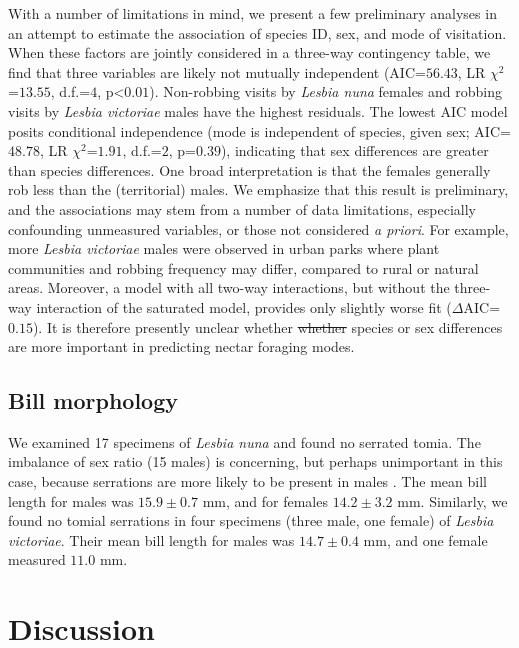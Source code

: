 \documentclass[fleqn,10pt,lineno]{wlpeerj}
\providecommand{\DIFdeltex}[1]{{\protect\color{red}\sout{#1}}}                      %
\providecommand{\DIFdelbegin}{} %
\providecommand{\DIFdelend}{} %
\providecommand{\DIFdel}[1]{\texorpdfstring{\DIFdeltex{#1}}{}} %
\begin{document}
With a number of limitations in mind, we present a few preliminary analyses in an attempt to estimate the association of species ID, sex, and mode of visitation. 
When these factors are jointly considered in a three-way contingency table, we find that three variables are likely not mutually independent (AIC=$56.43$, LR $\chi^{2}$=$13.55$, d.f.=$4$, p<$0.01$).
Non-robbing visits by \textit{Lesbia nuna} females and robbing visits by \textit{Lesbia victoriae} males have the highest residuals.
The lowest AIC model posits conditional independence (mode is independent of species, given sex; AIC=$48.78$, LR $\chi^{2}$=$1.91$, d.f.=$2$, p=$0.39$), indicating that sex differences are greater than species differences.
One broad interpretation is that the females generally rob less than the (territorial) males.
We emphasize that this result is preliminary, and the associations may stem from a number of data limitations, especially confounding unmeasured variables, or those not considered \textit{a priori}. 
For example, more \textit{Lesbia victoriae} males were observed in urban parks where plant communities and robbing frequency may differ, compared to rural or natural areas.
Moreover, a model with all two-way interactions, but without the three-way interaction of the saturated model, provides only slightly worse fit ($\Delta$AIC=$0.15$). It is therefore presently unclear whether \DIFdelbegin \DIFdel{whether }\DIFdelend species or sex differences are more important in predicting nectar foraging modes. %

\subsection*{Bill morphology}
We examined 17 specimens of \textit{Lesbia nuna} and found no serrated tomia. %
The imbalance of sex ratio (15 males) is concerning, but perhaps unimportant in this case, because serrations are more likely to be present in males \citep{rico-guevara2019}. 
The mean bill length for males was $15.9 \pm 0.7$ mm, and for females $14.2 \pm 3.2$ mm. Similarly, we found no tomial serrations in four specimens (three male, one female) of \textit{Lesbia victoriae}. 
Their mean bill length for males was $14.7 \pm 0.4$ mm, and one female measured $11.0$ mm.


\section*{Discussion}
\end{document}
